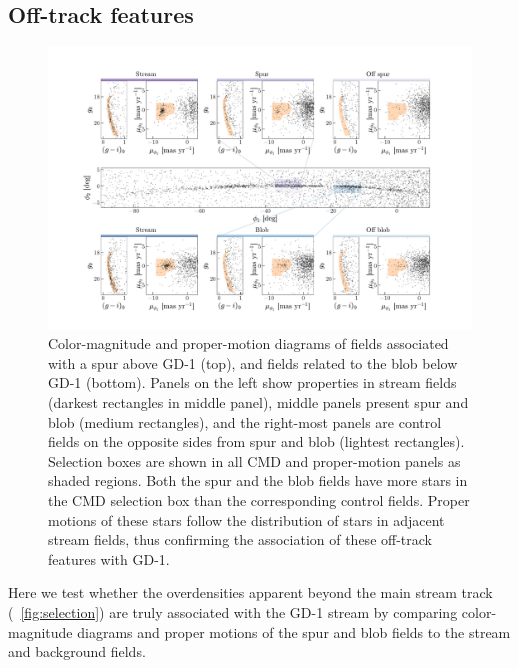 \documentclass[modern]{aastex62}
\newcommand{\gaia}{\textsl{Gaia}}
\begin{document}
\subsection{Off-track features}
\label{sec:res_gap}

\begin{figure}
\begin{center}
\includegraphics[width=\textwidth]{features.pdf}
\end{center}
\caption{
Color-magnitude and proper-motion diagrams of fields associated with a spur above GD-1 (top), and fields related to the blob below GD-1 (bottom).
Panels on the left show properties in stream fields (darkest rectangles in middle panel), middle panels present spur and blob (medium rectangles), and the right-most panels are control fields on the opposite sides from spur and blob (lightest rectangles).
Selection boxes are shown in all CMD and proper-motion panels as shaded regions.
Both the spur and the blob fields have more stars in the CMD selection box than the corresponding control fields.
Proper motions of these stars follow the distribution of stars in adjacent stream fields, thus confirming the association of these off-track features with GD-1.
}
\label{fig:features}
\end{figure}

Here we test whether the overdensities apparent beyond the main stream track
(\figurename~\ref{fig:selection}) are truly associated with the GD-1 stream by
comparing color-magnitude diagrams and proper motions of the spur and blob
fields to the stream and background fields.
\end{document}
